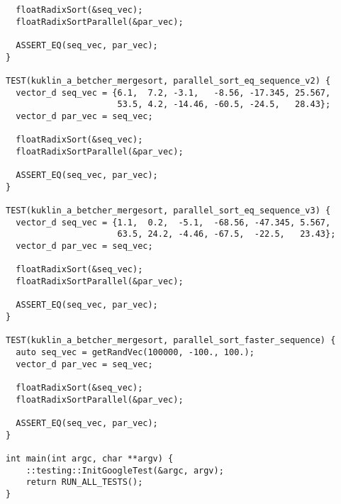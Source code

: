 \documentclass{report}
\begin{document}
\begin{lstlisting}
  floatRadixSort(&seq_vec);
  floatRadixSortParallel(&par_vec);

  ASSERT_EQ(seq_vec, par_vec);
}

TEST(kuklin_a_betcher_mergesort, parallel_sort_eq_sequence_v2) {
  vector_d seq_vec = {6.1,  7.2, -3.1,   -8.56, -17.345, 25.567,
                      53.5, 4.2, -14.46, -60.5, -24.5,   28.43};
  vector_d par_vec = seq_vec;

  floatRadixSort(&seq_vec);
  floatRadixSortParallel(&par_vec);

  ASSERT_EQ(seq_vec, par_vec);
}

TEST(kuklin_a_betcher_mergesort, parallel_sort_eq_sequence_v3) {
  vector_d seq_vec = {1.1,  0.2,  -5.1,  -68.56, -47.345, 5.567,
                      63.5, 24.2, -4.46, -67.5,  -22.5,   23.43};
  vector_d par_vec = seq_vec;

  floatRadixSort(&seq_vec);
  floatRadixSortParallel(&par_vec);

  ASSERT_EQ(seq_vec, par_vec);
}

TEST(kuklin_a_betcher_mergesort, parallel_sort_faster_sequence) {
  auto seq_vec = getRandVec(100000, -100., 100.);
  vector_d par_vec = seq_vec;

  floatRadixSort(&seq_vec);
  floatRadixSortParallel(&par_vec);

  ASSERT_EQ(seq_vec, par_vec);
}

int main(int argc, char **argv) {
    ::testing::InitGoogleTest(&argc, argv);
    return RUN_ALL_TESTS();
}
\end{lstlisting}
\end{document}
